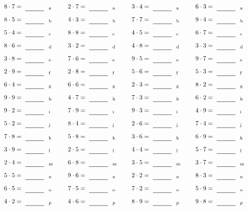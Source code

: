 \documentclass
[
  draft    = true,
  fontsize = 11pt,
  parskip  = half-
]
{scrartcl}
\begin{document}
\par\vfill\par
\begin{align*}
    \pline{8\cdot7}&=\rline{a}
  & \pline{2\cdot7}&=\rline{a}
  & \pline{3\cdot4}&=\rline{a}
  & \pline{6\cdot3}&=\rline{a} \\[1ex]
    \pline{8\cdot5}&=\rline{b}
  & \pline{4\cdot3}&=\rline{b}
  & \pline{7\cdot7}&=\rline{b}
  & \pline{9\cdot4}&=\rline{b} \\[1ex]
    \pline{5\cdot4}&=\rline{c}
  & \pline{8\cdot8}&=\rline{c}
  & \pline{4\cdot5}&=\rline{c}
  & \pline{6\cdot7}&=\rline{c} \\[1ex]
    \pline{8\cdot6}&=\rline{d}
  & \pline{3\cdot2}&=\rline{d}
  & \pline{4\cdot8}&=\rline{d}
  & \pline{3\cdot3}&=\rline{d} \\[1ex]
    \pline{3\cdot8}&=\rline{e}
  & \pline{7\cdot6}&=\rline{e}
  & \pline{9\cdot5}&=\rline{e}
  & \pline{9\cdot7}&=\rline{e} \\[1ex]
    \pline{2\cdot9}&=\rline{f}
  & \pline{2\cdot8}&=\rline{f}
  & \pline{5\cdot6}&=\rline{f}
  & \pline{5\cdot3}&=\rline{f} \\[1ex]
    \pline{6\cdot4}&=\rline{g}
  & \pline{6\cdot6}&=\rline{g}
  & \pline{2\cdot3}&=\rline{g}
  & \pline{8\cdot2}&=\rline{g} \\[1ex]
    \pline{9\cdot9}&=\rline{h}
  & \pline{4\cdot7}&=\rline{h}
  & \pline{7\cdot3}&=\rline{h}
  & \pline{6\cdot2}&=\rline{h} \\[1ex]
    \pline{9\cdot2}&=\rline{i}
  & \pline{7\cdot9}&=\rline{i}
  & \pline{9\cdot3}&=\rline{i}
  & \pline{4\cdot9}&=\rline{i} \\[1ex]
    \pline{5\cdot2}&=\rline{j}
  & \pline{8\cdot4}&=\rline{j}
  & \pline{2\cdot6}&=\rline{j}
  & \pline{7\cdot4}&=\rline{j} \\[1ex]
    \pline{7\cdot8}&=\rline{k}
  & \pline{5\cdot8}&=\rline{k}
  & \pline{3\cdot6}&=\rline{k}
  & \pline{6\cdot9}&=\rline{k} \\[1ex]
    \pline{3\cdot9}&=\rline{l}
  & \pline{2\cdot5}&=\rline{l}
  & \pline{4\cdot4}&=\rline{l}
  & \pline{5\cdot7}&=\rline{l} \\[1ex]
    \pline{2\cdot4}&=\rline{m}
  & \pline{6\cdot8}&=\rline{m}
  & \pline{3\cdot5}&=\rline{m}
  & \pline{3\cdot7}&=\rline{m} \\[1ex]
    \pline{5\cdot5}&=\rline{n}
  & \pline{9\cdot6}&=\rline{n}
  & \pline{2\cdot2}&=\rline{n}
  & \pline{8\cdot3}&=\rline{n} \\[1ex]
    \pline{6\cdot5}&=\rline{o}
  & \pline{7\cdot5}&=\rline{o}
  & \pline{7\cdot2}&=\rline{o}
  & \pline{5\cdot9}&=\rline{o} \\[1ex]
    \pline{4\cdot2}&=\rline{p}
  & \pline{4\cdot6}&=\rline{p}
  & \pline{8\cdot9}&=\rline{p}
  & \pline{9\cdot8}&=\rline{p}
\end{align*}
\end{document}
